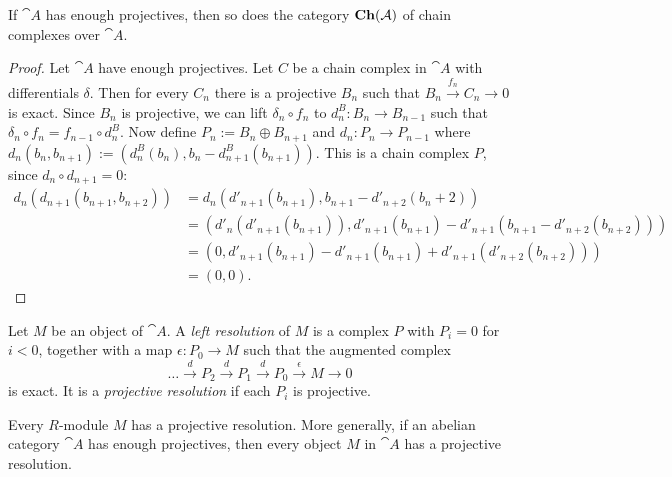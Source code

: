\begin{exercise}
	If $\cat{A}$ has enough projectives, then so does the category $\textrm{\textup{\textbf{Ch}}}(\mathcal{A})$ of chain complexes over $\cat{A}$.
\end{exercise}

\begin{proof}
	Let $\cat{A}$ have enough projectives.
	Let $C$ be a chain complex in $\cat{A}$ with differentials $\delta$.
	Then for every $C_n$ there is a projective $B_n$ such that $B_n \overset{f_n}{\longrightarrow} C_n \rightarrow 0$ is exact.
	Since $B_n$ is projective, we can lift $\delta_n\circ f_n$ to $d^B_n: B_n \rightarrow B_{n-1}$ such that $\delta_n\circ f_n = f_{n-1}\circ d^B_n$. 
	Now define $P_n := B_n \oplus B_{n+1}$ and $d_n: P_n \rightarrow P_{n-1}$ where $d_n(b_n,b_{n+1}) := (d^B_n(b_n), b_n - d^B_{n+1}(b_{n+1}))$.
	This is a chain complex $P$, since $d_n \circ d_{n+1} = 0$:
	\begin{align*}
		d_n( d_{n+1}( b_{n+1}, b_{n+2} ) )
		&= d_n( d'_{n+1}(b_{n+1}), b_{n+1} - d'_{n+2}({b_n+2})) \\
		&= (d'_n(d'_{n+1}(b_{n+1})), d'_{n+1}(b_{n+1}) - d'_{n+1}(b_{n+1} - d'_{n+2}(b_{n+2}))) \\
		&= (0, d'_{n+1}(b_{n+1}) - d'_{n+1}(b_{n+1}) + d'_{n+1}(d'_{n+2}(b_{n+2}))) \\
		&= (0, 0).
	\end{align*}
	
\end{proof}

\begin{definition}
	Let $M$ be an object of $\cat{A}$. A \textit{left resolution} of $M$ is a complex $P$ with $P_i=0$ for $i<0$, together with a map $\epsilon:P_0\rightarrow M$ such that the augmented complex
	$$\dots \overset{d}{\longrightarrow} P_2 \overset{d}{\longrightarrow} P_1 \overset{d}{\longrightarrow} P_0 \overset{\epsilon}{\longrightarrow} M \longrightarrow 0$$
	is exact. It is a \textit{projective resolution} if each $P_i$ is projective.
\end{definition}

\begin{lemma}
	Every $R$-module $M$ has a projective resolution. More generally, if an abelian category $\cat{A}$ has enough projectives, then every object $M$ in $\cat{A}$ has a projective resolution.
\end{lemma}

